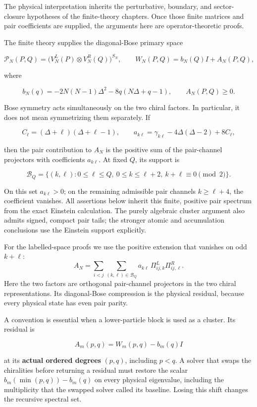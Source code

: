The physical interpretation inherits the perturbative, boundary, and sector-closure hypotheses of the finite-theory chapters. Once those finite matrices and pair coefficients are supplied, the arguments here are operator-theoretic proofs.

The finite theory supplies the diagonal-Bose primary space

\[
\mathcal P_N(P,Q)=\bigl(V_N^L(P)\otimes V_N^R(Q)\bigr)^{S_N},
\qquad W_N(P,Q)=b_N(Q)I+A_N(P,Q),
\]

where

\[
b_N(q)=-2N(N-1)\Delta^2-8q(N\Delta+q-1),\qquad A_N(P,Q)\geq0.
\]

Bose symmetry acts simultaneously on the two chiral factors. In particular, it does not mean symmetrizing them separately. If

\[
C_\ell=(\Delta+\ell)(\Delta+\ell-1),\qquad
 a_{k\ell}=\gamma_{k\ell}-4\Delta(\Delta-2)+8C_\ell,
\]

then the pair contribution to \(A_N\) is the positive sum of the pair-channel projectors with coefficients \(a_{k\ell}\). At fixed \(Q\), its support is

\[
\mathcal B_Q=\{(k,\ell):0\leq\ell\leq Q,\ 0\leq k\leq\ell+2,
\ k+\ell\equiv0\pmod2\}.
\]

On this set \(a_{k\ell}>0\); on the remaining admissible pair channels \(k\geq\ell+4\), the coefficient vanishes. All assertions below inherit this finite, positive pair spectrum from the exact Einstein calculation. The purely algebraic cluster argument also admits signed, compact pair tails; the stronger atomic and accumulation conclusions use the Einstein support explicitly.

For the labelled-space proofs we use the positive extension that vanishes on odd \(k+\ell\): \[
A_N=\sum_{i<j}\sum_{(k,\ell)\in\mathcal B_Q}
a_{k\ell}\,\Pi^L_{ij,k}\Pi^R_{ij,\ell}.
\] Here the two factors are orthogonal pair-channel projectors in the two chiral representations. Its diagonal-Bose compression is the physical residual, because every physical state has even pair parity.

A convention is essential when a lower-particle block is used as a cluster. Its residual is

\[
A_m(p,q)=W_m(p,q)-b_m(q)I
\tag{CL.1}
\]

at its \textbf{actual ordered degrees} \((p,q)\), including \(p<q\). A solver that swaps the chiralities before returning a residual must restore the scalar \(b_m(\min(p,q))-b_m(q)\) on every physical eigenvalue, including the multiplicity that the swapped solver called its baseline. Losing this shift changes the recursive spectral set.

